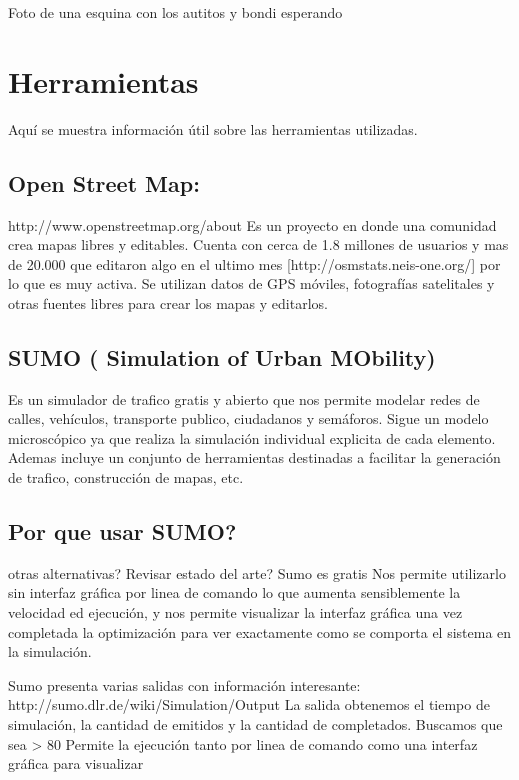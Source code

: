 Foto de una esquina con los autitos y bondi esperando



\section{Herramientas}
Aquí se muestra información útil sobre las herramientas utilizadas.

\subsection{Open Street Map:} 
http://www.openstreetmap.org/about  Es un proyecto en donde una comunidad crea mapas libres y editables. Cuenta con cerca de 1.8 millones de usuarios  y  mas de 20.000 que editaron algo en el ultimo mes [http://osmstats.neis-one.org/] por lo que es muy activa. Se utilizan datos de GPS móviles, fotografías satelitales y otras fuentes libres para crear los mapas y editarlos. 

\subsection{SUMO ( Simulation of Urban MObility)}
Es un simulador de trafico gratis y abierto que nos permite modelar redes de calles, vehículos, transporte publico, ciudadanos y semáforos. Sigue un modelo microscópico ya que realiza la simulación individual explicita de cada elemento. Ademas incluye un conjunto de herramientas destinadas  a facilitar la generación de trafico, construcción de mapas, etc. 


\subsection{Por que usar SUMO? }
otras alternativas? Revisar estado del arte?
Sumo es gratis
Nos permite utilizarlo sin interfaz gráfica por linea de comando lo que aumenta sensiblemente la velocidad ed ejecución, y  nos permite visualizar la interfaz gráfica una vez completada la optimización para ver exactamente como se comporta el sistema en la simulación.

Sumo presenta varias salidas con información interesante: http://sumo.dlr.de/wiki/Simulation/Output 
La salida obtenemos el tiempo de simulación, la cantidad de emitidos y la cantidad de completados. Buscamos que sea > 80%
Permite la ejecución tanto por linea de comando como una interfaz gráfica para visualizar

